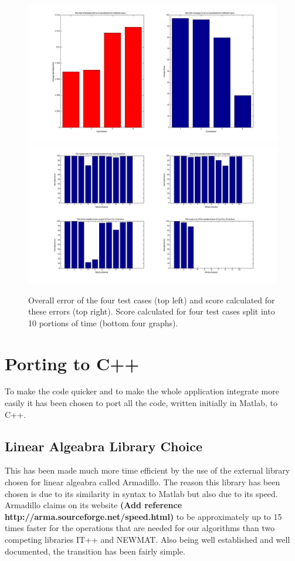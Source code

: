 \documentclass[a4paper]{article}
\begin{document}
\begin{figure}[H]
\centering
\includegraphics[scale=0.15]{Data_Analysis_Average_Score.jpg}
\includegraphics[scale=0.15]{Data_Analysis_Window_Score.jpg}

\caption{Overall error of the four test cases (top left) and score calculated for these errors (top right). Score calculated for four test cases split into 10 portions of time (bottom four graphs).}
\label{error_score}
\end{figure}

\clearpage
\section{Porting to C++}
\noindent
To make the code quicker and to make the whole application integrate more easily it has been chosen to port all the code, written initially in Matlab, to C++. 
\subsection{Linear Algeabra Library Choice}
This has been made much more time efficient by the use of the external library chosen for linear algeabra called Armadillo.  The reason this library has been chosen is due to its similarity in syntax to Matlab but also due to its speed. Armadillo claims on its website \textbf{(Add reference http://arma.sourceforge.net/speed.html)} to be approximately up to 15 times faster for the operations that are needed for our algorithms than two competing libraries IT++ and NEWMAT. Also being well established and well documented, the transition has been fairly simple.  
\end{document}
